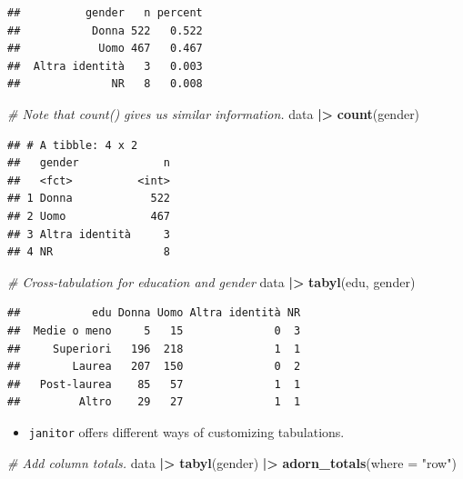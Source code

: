 \documentclass[
]{book}
\newenvironment{Shaded}{\begin{snugshade}}{\end{snugshade}}
\newcommand{\AttributeTok}[1]{\textcolor[rgb]{0.13,0.29,0.53}{#1}}
\newcommand{\CommentTok}[1]{\textcolor[rgb]{0.56,0.35,0.01}{\textit{#1}}}
\newcommand{\FunctionTok}[1]{\textcolor[rgb]{0.13,0.29,0.53}{\textbf{#1}}}
\newcommand{\NormalTok}[1]{#1}
\newcommand{\SpecialCharTok}[1]{\textcolor[rgb]{0.81,0.36,0.00}{\textbf{#1}}}
\newcommand{\StringTok}[1]{\textcolor[rgb]{0.31,0.60,0.02}{#1}}
\providecommand{\tightlist}{%
  \setlength{\itemsep}{0pt}\setlength{\parskip}{0pt}}
\begin{document}
\begin{verbatim}
##          gender   n percent
##           Donna 522   0.522
##            Uomo 467   0.467
##  Altra identità   3   0.003
##              NR   8   0.008
\end{verbatim}

\begin{Shaded}
\begin{Highlighting}[]
\CommentTok{\# Note that count() gives us similar information.}
\NormalTok{data }\SpecialCharTok{|\textgreater{}} 
  \FunctionTok{count}\NormalTok{(gender)}
\end{Highlighting}
\end{Shaded}

\begin{verbatim}
## # A tibble: 4 x 2
##   gender             n
##   <fct>          <int>
## 1 Donna            522
## 2 Uomo             467
## 3 Altra identità     3
## 4 NR                 8
\end{verbatim}

\begin{Shaded}
\begin{Highlighting}[]
\CommentTok{\# Cross{-}tabulation for education and gender}
\NormalTok{data }\SpecialCharTok{|\textgreater{}} 
  \FunctionTok{tabyl}\NormalTok{(edu, gender)}
\end{Highlighting}
\end{Shaded}

\begin{verbatim}
##           edu Donna Uomo Altra identità NR
##  Medie o meno     5   15              0  3
##     Superiori   196  218              1  1
##        Laurea   207  150              0  2
##   Post-laurea    85   57              1  1
##         Altro    29   27              1  1
\end{verbatim}

\begin{itemize}
\tightlist
\item
  \texttt{janitor} offers different ways of customizing tabulations.
\end{itemize}

\begin{Shaded}
\begin{Highlighting}[]
\CommentTok{\# Add column totals.}
\NormalTok{data }\SpecialCharTok{|\textgreater{}} 
  \FunctionTok{tabyl}\NormalTok{(gender) }\SpecialCharTok{|\textgreater{}} 
  \FunctionTok{adorn\_totals}\NormalTok{(}\AttributeTok{where =} \StringTok{"row"}\NormalTok{)}
\end{Highlighting}
\end{Shaded}
\end{document}
